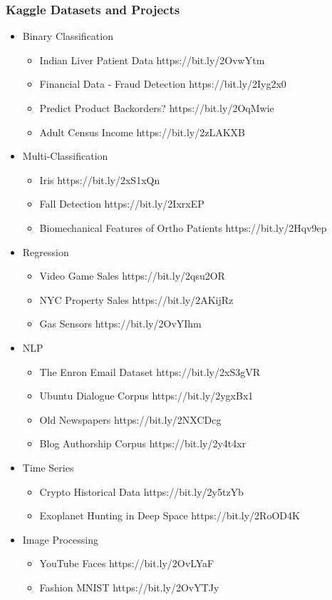 \begin{frame}\frametitle{Kaggle Datasets and Projects}
\footnotesize
\begin{itemize}
\item Binary Classification
\begin{itemize}
\item Indian Liver Patient Data https://bit.ly/2OvwYtm
\item Financial Data - Fraud Detection https://bit.ly/2Iyg2x0
\item Predict Product Backorders? https://bit.ly/2OqMwie
\item Adult Census Income https://bit.ly/2zLAKXB
\end{itemize}

\item Multi-Classification
\begin{itemize}
\item Iris https://bit.ly/2xS1xQn
\item Fall Detection https://bit.ly/2IxrxEP
\item Biomechanical Features of Ortho Patients https://bit.ly/2Hqv9ep
\end{itemize}
\item Regression
\begin{itemize}
\item Video Game Sales https://bit.ly/2qsu2OR
\item NYC Property Sales https://bit.ly/2AKijRz
\item Gas Sensors https://bit.ly/2OvYIhm
\end{itemize}
\item NLP
\begin{itemize}
\item The Enron Email Dataset https://bit.ly/2xS3gVR
\item Ubuntu Dialogue Corpus https://bit.ly/2ygxBx1
\item Old Newspapers https://bit.ly/2NXCDcg
\item Blog Authorship Corpus https://bit.ly/2y4t4xr
\end{itemize}
\item Time Series
\begin{itemize}
\item Crypto Historical Data https://bit.ly/2y5tzYb
\item Exoplanet Hunting in Deep Space https://bit.ly/2RoOD4K
\end{itemize}
\item Image Processing
\begin{itemize}
\item YouTube Faces https://bit.ly/2OvLYaF
\item Fashion MNIST https://bit.ly/2OvYTJy
\end{itemize}
\end{itemize}
\end{frame}


